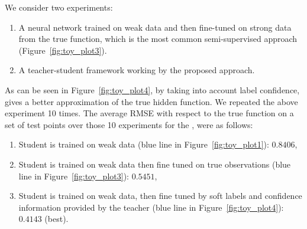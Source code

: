 We consider two experiments: 
\begin{enumerate}[leftmargin=*]
\setlength{\topsep}{0.3pt}
\setlength{\partopsep}{0.3pt}
\setlength{\itemsep}{0.3pt}
\setlength{\parskip}{0.3pt}
\setlength{\parsep}{0.3pt}
    \item A neural network trained on weak data and then fine-tuned on strong data from the true function, which is the most common semi-supervised approach (Figure~\ref{fig:toy_plot3}).
    \item A teacher-student framework working by the proposed \fwl approach.
\end{enumerate} 

As can be seen in Figure~\ref{fig:toy_plot4}, \fwl by taking into account label confidence, gives a better approximation of the true hidden function.  We repeated the above experiment 10 times. The average RMSE with respect to the true function on a set of test points over those 10 experiments for the \std, were as follows:
\begin{enumerate}[leftmargin=*]
\setlength{\topsep}{0.3pt}
\setlength{\partopsep}{0.3pt}
\setlength{\itemsep}{0.3pt}
\setlength{\parskip}{0.3pt}
\setlength{\parsep}{0.3pt}
    \item Student is trained on weak data (blue line in Figure~\ref{fig:toy_plot1}): $0.8406$,
    \item Student is trained on weak data then fine tuned on true observations (blue line in Figure~\ref{fig:toy_plot3}): $0.5451$,
    \item Student is trained on weak data, then fine tuned by soft labels and confidence information provided by the teacher (blue line in Figure~\ref{fig:toy_plot4}): $0.4143$ (best).
\end{enumerate}


